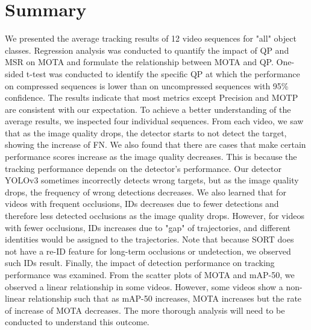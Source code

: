 \section{Summary}
\label{sec:results/summary}

We presented the average tracking results of 12 video sequences for "all" object classes. Regression analysis was conducted to quantify the impact of QP and MSR on MOTA and formulate the relationship between MOTA and QP. One-sided t-test was conducted to identify the specific QP at which the performance on compressed sequences is lower than on uncompressed sequences with 95\% confidence. The results indicate that most metrics except Precision and MOTP are consistent with our expectation. To achieve a better understanding of the average results, we inspected four individual sequences. From each video, we saw that as the image quality drops, the detector starts to not detect the target, showing the increase of FN. We also found that there are cases that make certain performance scores increase as the image quality decreases. This is because the tracking performance depends on the detector's performance. Our detector YOLOv3 sometimes incorrectly detects wrong targets, but as the image quality drops, the frequency of wrong detections decreases. We also learned that for videos with frequent occlusions, IDs decreases due to fewer detections and therefore less detected occlusions as the image quality drops. However, for videos with fewer occlusions, IDs increases due to "gap" of trajectories, and different identities would be assigned to the trajectories. Note that because SORT does not have a re-ID feature for long-term occlusions or undetection, we observed such IDs result. Finally, the impact of detection performance on tracking performance was examined. From the scatter plots of MOTA and mAP-50, we observed a linear relationship in some videos. However, some videos show a non-linear relationship such that as mAP-50 increases, MOTA increases but the rate of increase of MOTA decreases. The more thorough analysis will need to be conducted to understand this outcome.
